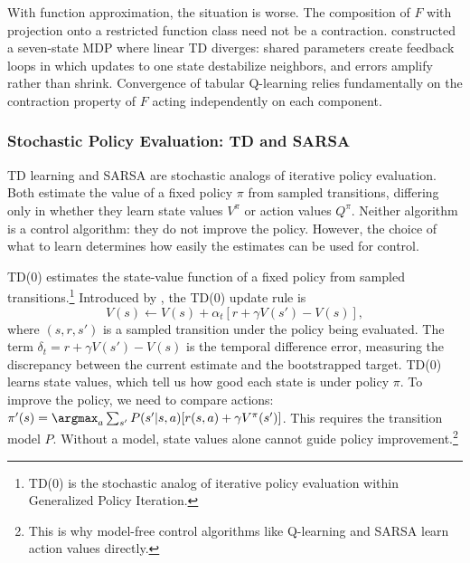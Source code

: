 With function approximation, the situation is worse. The composition of $F$ with projection onto a restricted function class need not be a contraction. \citet{Baird1995} constructed a seven-state MDP where linear TD diverges: shared parameters create feedback loops in which updates to one state destabilize neighbors, and errors amplify rather than shrink. Convergence of tabular Q-learning relies fundamentally on the contraction property of $F$ acting independently on each component.

\subsubsection{Stochastic Policy Evaluation: TD and SARSA}

TD learning and SARSA are stochastic analogs of iterative policy evaluation. Both estimate the value of a fixed policy $\pi$ from sampled transitions, differing only in whether they learn state values $V^\pi$ or action values $Q^\pi$. Neither algorithm is a control algorithm: they do not improve the policy. However, the choice of what to learn determines how easily the estimates can be used for control.

TD(0) estimates the state-value function of a fixed policy from sampled transitions.\footnote{TD(0) is the stochastic analog of iterative policy evaluation within Generalized Policy Iteration.} Introduced by \citet{sutton1988}, the TD(0) update rule is
\begin{equation}
V(s) \leftarrow V(s) + \alpha_t \left[ r + \gamma V(s') - V(s) \right],
\end{equation}
where $(s,r,s')$ is a sampled transition under the policy being evaluated. The term $\delta_t = r + \gamma V(s') - V(s)$ is the temporal difference error, measuring the discrepancy between the current estimate and the bootstrapped target. TD(0) learns state values, which tell us how good each state is under policy $\pi$. To improve the policy, we need to compare actions: $\pi'(s) = \argmax_a \sum_{s'} P(s'|s,a)[r(s,a) + \gamma V^\pi(s')]$. This requires the transition model $P$. Without a model, state values alone cannot guide policy improvement.\footnote{This is why model-free control algorithms like Q-learning and SARSA learn action values directly.}

